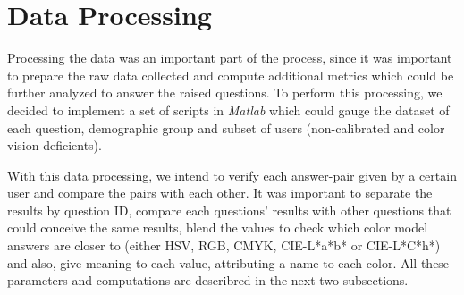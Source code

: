 \section{Data Processing}
\label{sec:results_digest}
%
Processing the data was an important part of the process, since it was important to prepare the raw data collected and compute additional metrics which could be further
analyzed to answer the raised questions. To perform this processing, we decided to implement a set of scripts in \emph{Matlab} which could gauge the dataset of each question,
demographic group and subset of users (non-calibrated and color vision deficients). \par
%
With this data processing, we intend to verify each answer-pair given by a certain user and compare the pairs with each other. It was important to separate the results by question
ID, compare each questions' results with other questions that could conceive the same results, blend the values to check which color model answers are closer to (either \gls{HSV}, \gls{RGB},
\gls{CMYK}, CIE-L*a*b* or CIE-L*C*h*) and also, give meaning to each value, attributing a name to each color. All these parameters and computations are describred in the next two
subsections.
%
